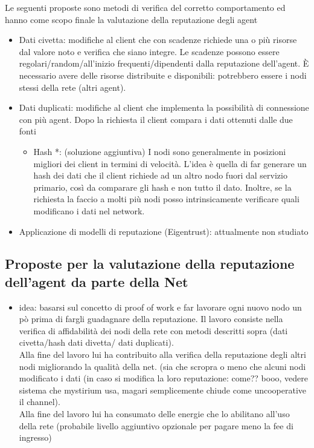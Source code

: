 \documentclass[]{article}
\begin{document}
	Le seguenti proposte sono metodi di verifica del corretto comportamento ed hanno come scopo finale la valutazione della reputazione degli agent
	\begin{itemize}
		\item Dati civetta: modifiche al client che con scadenze richiede una o più risorse dal valore noto e verifica che siano integre. Le scadenze possono essere regolari/random/all’inizio frequenti/dipendenti dalla reputazione dell’agent. È necessario avere delle risorse distribuite e disponibili: potrebbero essere i nodi stessi della rete (altri agent).
		\item Dati duplicati: modifiche al client che implementa la possibilità di connessione con più agent. Dopo la richiesta il client compara i dati ottenuti dalle due fonti
		\begin{itemize}
			\item Hash *: (soluzione aggiuntiva) I nodi sono generalmente in posizioni migliori dei client in termini di velocità. L’idea è quella di far generare un hash dei dati che il client richiede ad un altro nodo fuori dal servizio primario, così da comparare gli hash e non tutto il dato.
			Inoltre, se la richiesta la faccio a molti più nodi posso intrinsicamente verificare quali modificano i dati nel network.
		\end{itemize}
		\item Applicazione di modelli di reputazione (Eigentrust): attualmente non studiato
	\end{itemize}
	
	\subsection{Proposte per la valutazione della reputazione dell'agent da parte della Net}
	
	\begin{itemize}
		\item idea: basarsi sul concetto di proof of work e far lavorare ogni nuovo nodo un pò prima di fargli guadagnare della reputazione. Il lavoro consiste nella verifica di affidabilità dei nodi della rete con metodi descritti sopra (dati civetta/hash dati divetta/ dati duplicati).\\
		Alla fine del lavoro lui ha contribuito alla verifica della reputazione degli altri nodi migliorando la qualità della net. (sia che scropra o meno che alcuni nodi modificato i dati (in caso si modifica la loro reputazione: come?? booo, vedere sistema che mystirium usa, magari semplicemente chiude come uncooperative il channel).\\
		Alla fine del lavoro lui ha consumato delle energie che lo abilitano all'uso della rete (probabile livello aggiuntivo opzionale per pagare meno la fee di ingresso)
	
	\end{itemize}
	
\end{document}
